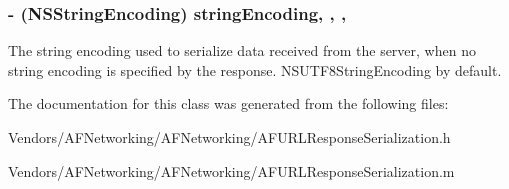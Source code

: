 \subsubsection[{string\+Encoding}]{\setlength{\rightskip}{0pt plus 5cm}-\/ (N\+S\+String\+Encoding) string\+Encoding\hspace{0.3cm}{\ttfamily [read]}, {\ttfamily [write]}, {\ttfamily [nonatomic]}, {\ttfamily [assign]}}\label{interface_a_f_h_t_t_p_response_serializer_a91382381388e01522dabf5c81e91ca62}
The string encoding used to serialize data received from the server, when no string encoding is specified by the response. {\ttfamily N\+S\+U\+T\+F8\+String\+Encoding} by default. 

The documentation for this class was generated from the following files\+:\begin{DoxyCompactItemize}
\item 
Vendors/\+A\+F\+Networking/\+A\+F\+Networking/A\+F\+U\+R\+L\+Response\+Serialization.\+h\item 
Vendors/\+A\+F\+Networking/\+A\+F\+Networking/A\+F\+U\+R\+L\+Response\+Serialization.\+m\end{DoxyCompactItemize}
